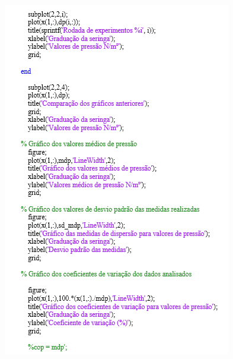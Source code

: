 \begin{apendicesenv}
\begin{figure}[H]
		\centering
			\includegraphics[scale=1.0]{figuras/rotina3.png}
		\label{rotina3}
\end{figure}




\end{apendicesenv}















